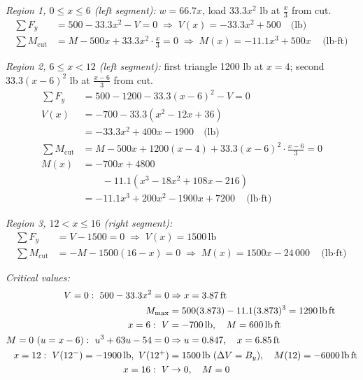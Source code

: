 \documentclass[11pt]{article}
\newcommand{\un}[1]{\,\text{#1}}
\begin{document}
\textit{Region 1, $0 \le x \le 6$ (left segment):} $w = 66.7x$, load $33.3x^2$ lb at $\tfrac{x}{3}$ from cut.
\begin{align*}
\textstyle\sum F_y &= 500 - 33.3x^2 - V = 0 \;\Rightarrow\; V(x) = -33.3x^2 + 500 \quad \text{(lb)}\\
\textstyle\sum M_{\text{cut}} &= M - 500x + 33.3x^2\cdot\frac{x}{3} = 0 \;\Rightarrow\; M(x) = -11.1x^3 + 500x \quad \text{(lb$\cdot$ft)}
\end{align*}

\textit{Region 2, $6 \le x < 12$ (left segment):} first triangle 1200 lb at $x = 4$; second $33.3(x-6)^2$ lb at $\tfrac{x-6}{3}$ from cut.
\begin{align*}
\textstyle\sum F_y &= 500 - 1200 - 33.3(x-6)^2 - V = 0\\
V(x) &= -700 - 33.3(x^2 - 12x + 36)\\
&= -33.3x^2 + 400x - 1900 \quad \text{(lb)}\\
\textstyle\sum M_{\text{cut}} &= M - 500x + 1200(x-4) + 33.3(x-6)^2\cdot\frac{x-6}{3} = 0\\
M(x) &= -700x + 4800\\ &\qquad - 11.1(x^3 - 18x^2 + 108x - 216)\\
&= -11.1x^3 + 200x^2 - 1900x + 7200 \quad \text{(lb$\cdot$ft)}
\end{align*}

\textit{Region 3, $12 < x \le 16$ (right segment):}
\begin{align*}
\textstyle\sum F_y &= V - 1500 = 0 \;\Rightarrow\; V(x) = 1500\un{lb}\\
\textstyle\sum M_{\text{cut}} &= -M - 1500(16 - x) = 0 \;\Rightarrow\; M(x) = 1500x - 24\,000 \quad \text{(lb$\cdot$ft)}
\end{align*}

\textit{Critical values:}
\begin{align*}
V = 0:\ 500 - 33.3x^2 = 0 &\Rightarrow x = 3.87\un{ft}\\ M_{\max} &= 500(3.873) - 11.1(3.873)^3 = 1290\un{lb\,ft}\\
x = 6:\ V &= -700\un{lb},\quad M = 600\un{lb\,ft}\\
M = 0\ (u = x-6):\ u^3 + 63u - 54 = 0 &\Rightarrow u = 0.847,\quad x = 6.85\un{ft}\\
x = 12:\ V(12^-) = -1900\un{lb},\ V(12^+) &= 1500\un{lb}\ (\Delta V = B_y),\quad M(12) = -6000\un{lb\,ft}\\
x = 16:\ V &\to 0,\quad M = 0
\end{align*}
\end{document}
